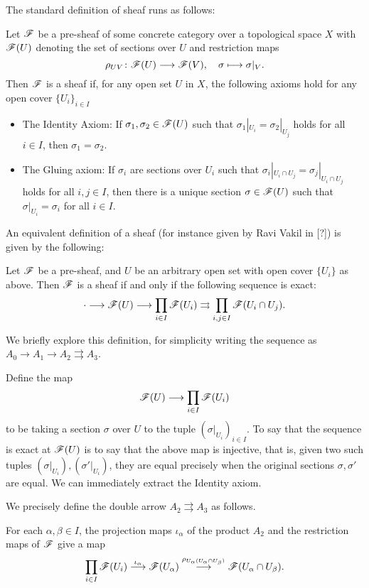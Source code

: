 \documentclass[a4paper]{article}
\begin{document}
\maketitle
The standard definition of sheaf runs as follows:
\begin{Definition}
    Let $\mathscr{F}$ be a pre-sheaf of some concrete category over a topological space $X$ with $\mathscr{F}(U)$ denoting the set of sections over $U$ and restriction maps 
    \[
        \rho_{UV}\colon\mathscr{F}(U)\longrightarrow \mathscr{F}(V),\quad\sigma\longmapsto \sigma|_V.
    \]
    Then $\mathscr{F}$ is a sheaf if, for any open set $U$ in $X$, the following axioms hold for any open cover $\{U_i\}_{i\in I}$
    \begin{itemize}
        \item The Identity Axiom: If $\sigma_1, \sigma_2 \in \mathscr{F}(U)$ such that $\sigma_1|_{U_i} = \sigma_2|_{U_j}$ holds for all $i\in I$, then $\sigma_1 = \sigma_2$.
        \item The Gluing axiom: If $\sigma_i$ are sections over $U_i$ such that $\sigma_i|_{U_i \cap U_j} = \sigma_j|_{U_i \cap U_j}$ holds for all $i, j\in I$, then there is a unique section $\sigma \in \mathscr{F}(U)$ such that $\sigma|_{U_i} = \sigma_i$ for all $i\in I$.
    \end{itemize}
\end{Definition}
An equivalent definition of a sheaf (for instance given by Ravi Vakil in [?]) is given by the following:
\begin{Definition}
    Let $\mathscr{F}$ be a pre-sheaf, and $U$ be an arbitrary open set with open cover $\{U_i\}$ as above. Then $\mathscr{F}$ is a sheaf if and only if the following sequence is exact:
    \[
        \cdot \longrightarrow \mathscr{F}(U) \longrightarrow  \prod_{i\in I} \mathscr{F}(U_i) \rightrightarrows \prod_{i,j \in I} \mathscr{F}(U_i \cap U_j).
    \]
\end{Definition}
We briefly explore this definition, for simplicity writing the sequence as $A_0 \to A_1 \to A_2 \rightrightarrows A_3$.

Define the map
\[
    \mathscr{F}(U) \longrightarrow \prod_{i\in I} \mathscr{F}(U_i)
\]
to be taking a section $\sigma$ over $U$ to the tuple $(\sigma|_{U_i})_{i\in I}$. To say that the sequence is exact at $\mathscr{F}(U)$ is to say that the above map is injective, that is, given two such tuples $(\sigma|_{U_i}), (\sigma'|_{U_i})$, they are equal precisely when the original sections $\sigma, \sigma'$ are equal. We can immediately extract the Identity axiom.


We precisely define the double arrow $A_2 \rightrightarrows A_3$ as follows. 

For each $\alpha,\beta \in I$, the projection maps $\iota_\alpha$ of the product $A_2$ and the restriction maps of $\mathscr{F}$ give a map
\[
    {\prod_{i \in I} \mathscr{F}(U_i)} \stackrel{\iota_\alpha}{\longrightarrow} { \mathscr{F}(U_\alpha)} \stackrel{\rho_{U_\alpha(U_\alpha \cap U_\beta)}}{\longrightarrow} {\mathscr{F}(U_\alpha \cap U_\beta)}.
\]
\end{document}
